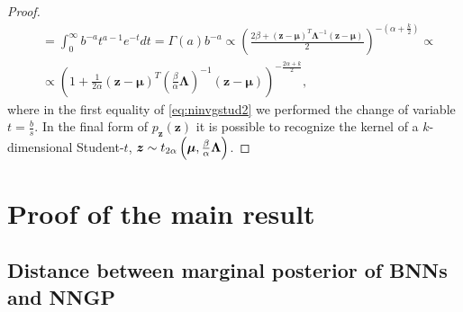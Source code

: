 \begin{proof}
\begin{equation}
\begin{aligned}
			& = \int_{0}^{\infty} b^{-a} t^{a - 1} e^{-t} dt = \Gamma(a) b^{-a} \propto \left(\frac{2 \beta + (\bm{z} - \bm{\mu})^T \bm{\Lambda}^{-1} (\bm{z} - \bm{\mu})}{2}\right)^{-\left(\alpha + \frac{k}{2}\right)} \propto \\
			& \propto \left(1 + \frac{1}{2 \alpha} (\bm{z} - \bm{\mu})^T \left(\frac{\beta}{\alpha} \bm{\Lambda}\right)^{-1} (\bm{z} - \bm{\mu})\right)^{-\frac{2\alpha + k}{2}},
		\end{aligned}
	\end{equation}
	where in the first equality of \cref{eq:ninvgstud2} we performed the change of variable $t = \frac{b}{s}$. In the final form of $p_{\bm{z}}(\bm{z})$ it is possible to recognize the kernel of a $k$-dimensional Student-$t$, $\bm{z} \sim t_{2 \alpha}\left(\bm{\mu}, \frac{\beta}{\alpha} \bm{\Lambda}\right)$.
\end{proof}

\section{Proof of the main result} \label{sec:mainproof}

\subsection{Distance between marginal posterior of BNNs and NNGP} \label{subsec:convposteriorsigma}

